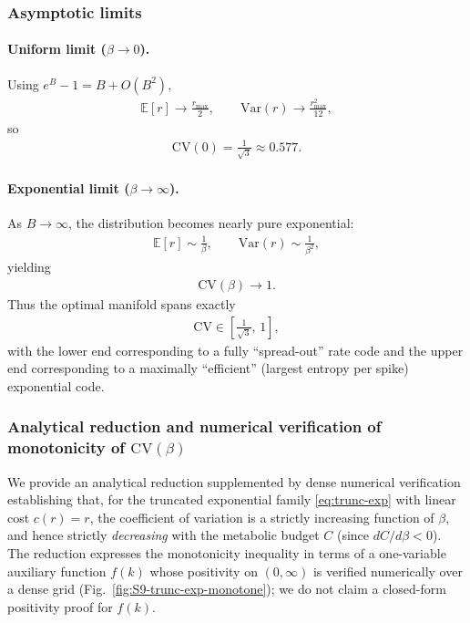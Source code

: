 \documentclass[11pt]{article}
\theoremstyle{remark}
\theoremstyle{definition}
\begin{document}
\subsubsection{Asymptotic limits}

\paragraph{Uniform limit ($\beta \to 0$).}
Using $e^B-1 = B + O(B^2)$,
\begin{align}
\mathbb{E}[r] \to \frac{r_{\max}}{2},\qquad
\mathrm{Var}(r) \to \frac{r_{\max}^2}{12},
\end{align}
so
\begin{align}
\mathrm{CV}(0)
= \frac{1}{\sqrt{3}}
\approx 0.577.
\end{align}

\paragraph{Exponential limit ($\beta \to \infty$).}
As $B\to\infty$, the distribution becomes nearly pure exponential:
\begin{align}
\mathbb{E}[r] \sim \frac{1}{\beta},\qquad
\mathrm{Var}(r) \sim \frac{1}{\beta^2},
\end{align}
yielding
\begin{align}
\mathrm{CV}(\beta) \to 1.
\end{align}
Thus the optimal manifold spans exactly
\begin{align}
\mathrm{CV}\in \left[\frac{1}{\sqrt{3}},\,1\right],
\end{align}
with the lower end corresponding to a fully ``spread-out'' rate code
and the upper end corresponding to a maximally ``efficient'' (largest
entropy per spike) exponential code.

\subsubsection{Analytical reduction and numerical verification of monotonicity of $\mathrm{CV}(\beta)$}

We provide an analytical reduction supplemented by dense numerical verification establishing that, for the truncated exponential family \eqref{eq:trunc-exp} with linear cost $c(r)=r$, the coefficient of variation is a strictly increasing function of $\beta$, and hence strictly \emph{decreasing} with the metabolic budget $C$ (since $dC/d\beta<0$).  The reduction expresses the monotonicity inequality in terms of a one-variable auxiliary function $f(k)$ whose positivity on $(0,\infty)$ is verified numerically over a dense grid (Fig.~\ref{fig:S9-trunc-exp-monotone}); we do not claim a closed-form positivity proof for $f(k)$.
\end{document}
